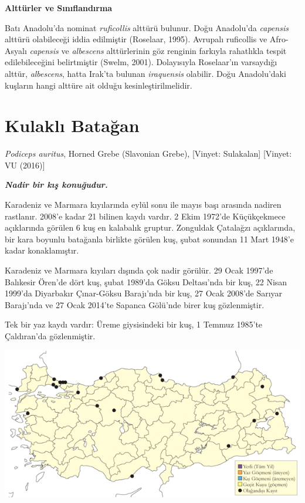 \documentclass[
  a4paper,
  DIV=11,
  numbers=noendperiod]{scrreprt}
\begin{document}
\textbf{Alttürler ve Sınıflandırma}

Batı Anadolu'da nominat \emph{ruficollis} alttürü bulunur. Doğu
Anadolu'da \emph{capensis} alttürü olabileceği iddia edilmiştir
(Roselaar, 1995). Avrupalı ruficollis ve Afro-Asyalı \emph{capensis} ve
\emph{albescens} alttürlerinin göz renginin farkıyla rahatlıkla tespit
edilebileceğini belirtmiştir (Swelm, 2001). Dolayısıyla Roselaar'ın
varsaydığı alttür, \emph{albescens}, hatta Irak'ta bulunan
\emph{iraquensis} olabilir. Doğu Anadolu'daki kuşların hangi alttüre ait
olduğu kesinleştirilmelidir.

\section{Kulaklı Batağan}\label{kulaklux131-bataux11fan}

\emph{Podiceps auritus}, Horned Grebe (Slavonian Grebe), {[}Vinyet:
Sulakalan{]} {[}Vinyet: VU (2016){]}

\textbf{\emph{Nadir bir kış konuğudur.}}

Karadeniz ve Marmara kıyılarında eylül sonu ile mayıs başı arasında
nadiren rastlanır. 2008'e kadar 21 bilinen kaydı vardır. 2 Ekim 1972'de
Küçükçekmece açıklarında görülen 6 kuş en kalabalık gruptur. Zonguldak
Çatalağzı açıklarında, bir kara boyunlu batağanla birlikte görülen kuş,
şubat sonundan 11 Mart 1948'e kadar konaklamıştır.

Karadeniz ve Marmara kıyıları dışında çok nadir görülür. 29 Ocak 1997'de
Balıkesir Ören'de dört kuş, şubat 1989'da Göksu Deltası'nda bir kuş, 22
Nisan 1999'da Diyarbakır Çınar-Göksu Barajı'nda bir kuş, 27 Ocak 2008'de
Sarıyar Barajı'nda ve 27 Ocak 2014'te Sapanca Gölü'nde birer kuş
gözlenmiştir.

Tek bir yaz kaydı vardır: Üreme giysisindeki bir kuş, 1 Temmuz 1985'te
Çaldıran'da gözlenmiştir.

\includegraphics{images/harita_Page_054.png}
\end{document}
